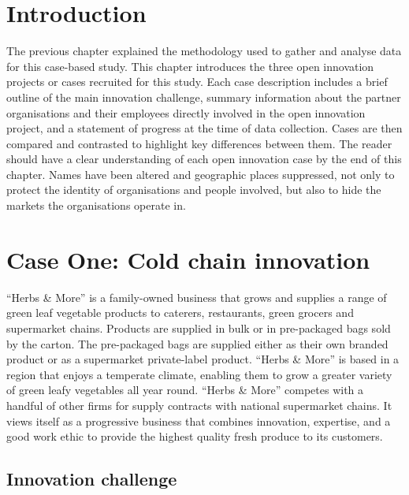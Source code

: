 
\section{Introduction}

The previous chapter explained the methodology used to gather and analyse data for this case-based study. This chapter introduces the three open innovation projects or cases recruited for this study. Each case description includes a brief outline of the main innovation challenge, summary information about the partner organisations and their employees directly involved in the open innovation project, and a statement of progress at the time of data collection. Cases are then compared and contrasted to highlight key differences between them. The reader should have a clear understanding of each open innovation case by the end of this chapter. Names have been altered and geographic places suppressed, not only to protect the identity of organisations and people involved, but also to hide the markets the organisations operate in. \medskip

\section{Case One: Cold chain innovation}

\enquote{Herbs \& More} is a family-owned business that grows and supplies a range of green leaf vegetable products to caterers, restaurants, green grocers and supermarket chains. Products are supplied in bulk or in pre-packaged bags sold by the carton. The pre-packaged bags are supplied either as their own branded product or as a supermarket private-label product. \enquote{Herbs \& More} is based in a region that enjoys a temperate climate, enabling them to grow a greater variety of green leafy vegetables all year round. \enquote{Herbs \& More} competes with a handful of other firms for supply contracts with national supermarket chains. It views itself as a progressive business that combines innovation, expertise, and a good work ethic to provide the highest quality fresh produce to its customers.\medskip

\subsection{Innovation challenge}

